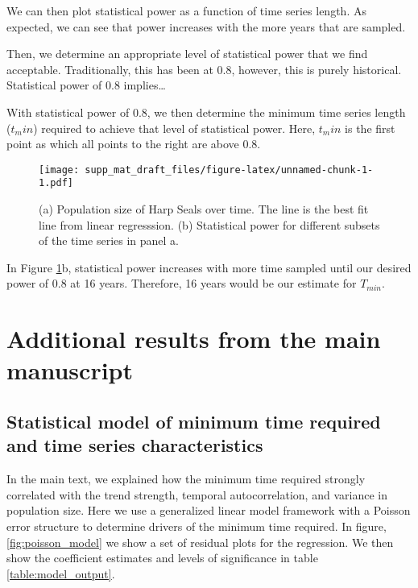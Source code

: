 \documentclass[12pt,]{article}
\begin{document}
We can then plot statistical power as a function of time series length.
As expected, we can see that power increases with the more years that
are sampled.

Then, we determine an appropriate level of statistical power that we
find acceptable. Traditionally, this has been at 0.8, however, this is
purely historical. Statistical power of 0.8 implies\ldots{}

With statistical power of 0.8, we then determine the minimum time series
length (\(t_min\)) required to achieve that level of statistical power.
Here, \(t_min\) is the first point as which all points to the right are
above 0.8.

\begin{figure}[htbp]
\centering
\texttt{[image: supp\_mat\_draft\_files/figure-latex/unnamed-chunk-1-1.pdf]}
\caption{(a) Population size of Harp Seals over time. The line is the
best fit line from linear regresssion. (b) Statistical power for
different subsets of the time series in panel
a.\label{fig:empirical_approach_example}}
\end{figure}

In Figure \ref{fig:empirical_approach_example}b, statistical power
increases with more time sampled until our desired power of 0.8 at 16
years. Therefore, 16 years would be our estimate for \(T_{min}\).

\section{Additional results from the main
manuscript}\label{additional-results-from-the-main-manuscript}

\subsection{Statistical model of minimum time required and time series
characteristics}\label{statistical-model-of-minimum-time-required-and-time-series-characteristics}

In the main text, we explained how the minimum time required strongly
correlated with the trend strength, temporal autocorrelation, and
variance in population size. Here we use a generalized linear model
framework with a Poisson error structure to determine drivers of the
minimum time required. In figure, \ref{fig:poisson_model} we show a set
of residual plots for the regression. We then show the coefficient
estimates and levels of significance in table \ref{table:model_output}.
\end{document}
